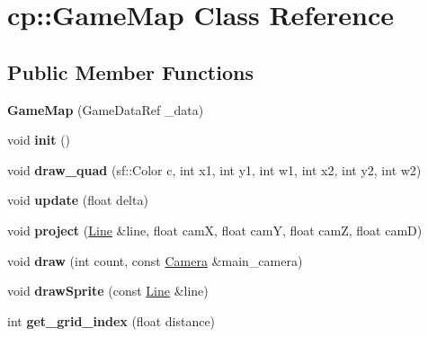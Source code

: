 \hypertarget{classcp_1_1_game_map}{}\section{cp\+:\+:Game\+Map Class Reference}
\label{classcp_1_1_game_map}
\subsection*{Public Member Functions}
\begin{DoxyCompactItemize}
\item 
\mbox{\label{classcp_1_1_game_map_a2d0def33bf9ef663f32d9abf7aca1844}} 
{\bfseries Game\+Map} (Game\+Data\+Ref \+\_\+data)
\item 
\mbox{\label{classcp_1_1_game_map_ad32e7dc2c373891d2b23be9d82298843}} 
void {\bfseries init} ()
\item 
\mbox{\label{classcp_1_1_game_map_a2e6704dd56becb268b447899dd325004}} 
void {\bfseries draw\+\_\+quad} (sf\+::\+Color c, int x1, int y1, int w1, int x2, int y2, int w2)
\item 
\mbox{\label{classcp_1_1_game_map_a789a1f584569d46ade271dcbc729e0ae}} 
void {\bfseries update} (float delta)
\item 
\mbox{\label{classcp_1_1_game_map_a549c0c56f71a0dac1569064c9619b6ef}} 
void {\bfseries project} (\hyperlink{classcp_1_1_line}{Line} \&line, float camX, float camY, float camZ, float camD)
\item 
\mbox{\label{classcp_1_1_game_map_a01e91f2a91d334c247e98eb9a1dc2cd9}} 
void {\bfseries draw} (int count, const \hyperlink{classcp_1_1_camera}{Camera} \&main\+\_\+camera)
\item 
\mbox{\label{classcp_1_1_game_map_a710565389773b9cc81645195bd835a1c}} 
void {\bfseries draw\+Sprite} (const \hyperlink{classcp_1_1_line}{Line} \&line)
\item 
\mbox{\label{classcp_1_1_game_map_a7a191dba96e48afa77801cd76ffc601e}} 
int {\bfseries get\+\_\+grid\+\_\+index} (float distance)

\end{DoxyCompactItemize}
